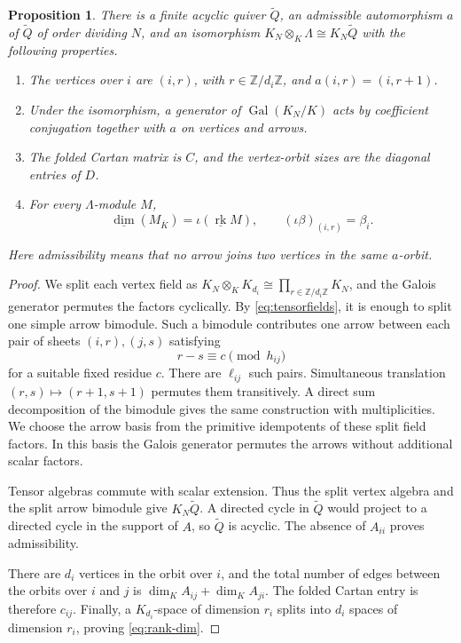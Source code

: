 \documentclass[11pt, reqno]{amsart}
\numberwithin{equation}{section}
\newtheorem{proposition}[theorem]{Proposition}
\theoremstyle{definition}
\theoremstyle{remark}
\newcommand{\op}[1]{\operatorname{#1}}
\newcommand{\mb}[1]{\mathbb{#1}}
\newcommand{\rk}{\underline{\op{rk}}}
\newcommand{\dimv}{\underline{\dim}}
\newcommand{\Gal}{\op{Gal}}
\newcommand{\Qbar}{\widetilde Q}
\newcommand{\Kbar}{\overline K}
\newcommand{\iso}{\cong}
\begin{document}
\begin{proposition}\label{prop:unfold}
There is a finite acyclic quiver $\Qbar$, an admissible automorphism
$a$ of $\Qbar$ of order dividing $N$, and an isomorphism
$K_N\otimes_K\Lambda\iso K_N\Qbar$
with the following properties.
\begin{enumerate}
\item The vertices over $i$ are $(i,r)$, with
$r\in\mb Z/d_i\mb Z$, and $a(i,r)=(i,r+1)$.
\item Under the isomorphism, a generator of $\Gal(K_N/K)$ acts by
coefficient conjugation together with $a$ on vertices and arrows.
\item The folded Cartan matrix is $C$, and the vertex-orbit sizes
are the diagonal entries of $D$.
\item For every $\Lambda$-module $M$,
\begin{equation}\label{eq:rank-dim} \dimv(M_{\Kbar})=\iota(\rk M),\qquad (\iota\beta)_{(i,r)}=\beta_i.\end{equation}
\end{enumerate}
Here admissibility means that no arrow joins two vertices in the same
$a$-orbit.
\end{proposition}
\begin{proof}
We split each vertex field as
$K_N\otimes_K K_{d_i}\iso\prod_{r\in\mb Z/d_i\mb Z}K_N$,
and the Galois generator permutes the factors cyclically. By
\eqref{eq:tensorfields}, it is enough to split one simple arrow
bimodule. Such a bimodule contributes one arrow between each pair of
sheets $(i,r),(j,s)$ satisfying
\[ r-s\equiv c\pmod {h_{ij}} \]
for a suitable fixed residue $c$. There are $\ell_{ij}$ such pairs. Simultaneous translation $(r,s)\mapsto(r+1,s+1)$ permutes them
transitively. A direct sum decomposition of the bimodule gives the
same construction with multiplicities. We choose the arrow basis from the primitive idempotents of these
split field factors. In this basis the Galois generator permutes the
arrows without additional scalar factors.

Tensor algebras commute with scalar extension. Thus the split vertex
algebra and the split arrow bimodule give $K_N\Qbar$. A directed cycle
in $\Qbar$ would project to a directed cycle in the support of $A$,
so $\Qbar$ is acyclic. The absence of $A_{ii}$ proves admissibility.

There are $d_i$ vertices in the orbit over $i$, and the total number
of edges between the orbits over $i$ and $j$ is
$\dim_K A_{ij}+\dim_K A_{ji}$. The folded Cartan entry is therefore
$c_{ij}$. Finally, a $K_{d_i}$-space of dimension $r_i$ splits into
$d_i$ spaces of dimension $r_i$, proving \eqref{eq:rank-dim}.
\end{proof}
\end{document}
